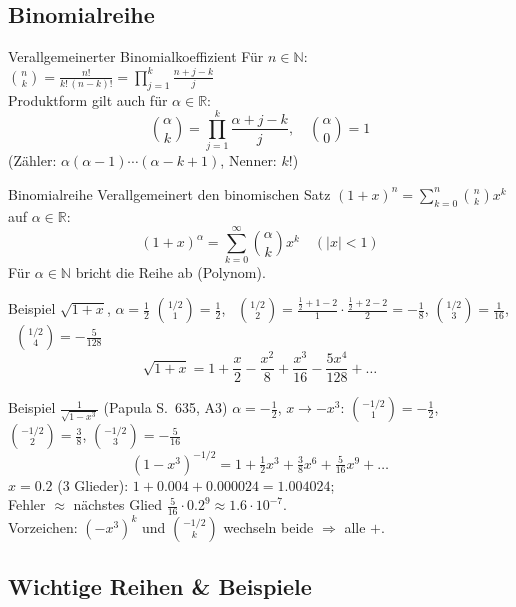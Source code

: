 \documentclass[a4paper, fontsize=7pt]{scrartcl}
\def\N{\mathbb{N}}  %
\def\R{\mathbb{R}}  %
\begin{document}
\subsection{Binomialreihe}

\begin{mainbox}{Verallgemeinerter Binomialkoeffizient}
Für $n \in \N$: $\binom{n}{k} = \frac{n!}{k!\,(n-k)!} =
\prod_{j=1}^{k} \frac{n + j - k}{j}$\\
Produktform gilt auch für $\alpha \in \R$:
$$\boxed{\binom{\alpha}{k} = \prod_{j=1}^{k} \frac{\alpha + j - k}{j}},
\quad \binom{\alpha}{0} = 1$$
(Zähler: $\alpha(\alpha-1)\cdots(\alpha-k+1)$, Nenner: $k!$)
\end{mainbox}

\begin{mainbox}{Binomialreihe}
Verallgemeinert den binomischen Satz
$(1+x)^n = \sum_{k=0}^{n} \binom{n}{k} x^k$ auf $\alpha \in \R$:
$$\boxed{(1 + x)^\alpha = \sum_{k=0}^{\infty} \binom{\alpha}{k} x^k}
\quad (|x| < 1)$$
Für $\alpha \in \N$ bricht die Reihe ab (Polynom).
\end{mainbox}

\begin{subbox}{Beispiel $\sqrt{1+x}$, $\alpha = \frac12$}
$\binom{1/2}{1} = \frac12$, \
$\binom{1/2}{2} = \frac{\frac12 + 1 - 2}{1}\cdot\frac{\frac12 + 2 - 2}{2} = -\frac18$,
$\binom{1/2}{3} = \frac{1}{16}$, \ $\binom{1/2}{4} = -\frac{5}{128}$
$$\sqrt{1+x} = 1 + \frac{x}{2} - \frac{x^2}{8} + \frac{x^3}{16}
- \frac{5x^4}{128} + \ldots$$
\end{subbox}

\begin{subbox}{Beispiel $\frac{1}{\sqrt{1 - x^3}}$ (Papula S.\ 635, A3)}
$\alpha = -\frac12$, $x \to -x^3$:
$\binom{-1/2}{1} = -\frac12$, $\binom{-1/2}{2} = \frac38$,
$\binom{-1/2}{3} = -\frac{5}{16}$
$$(1 - x^3)^{-1/2} = 1 + \tfrac12 x^3 + \tfrac38 x^6 + \tfrac{5}{16} x^9
+ \ldots$$
$x = 0.2$ (3 Glieder): $1 + 0.004 + 0.000024 = 1.004024$;\\
Fehler $\approx$ nächstes Glied $\frac{5}{16}\cdot 0.2^9 \approx 1.6
\cdot 10^{-7}$.\\
Vorzeichen: $(-x^3)^k$ und $\binom{-1/2}{k}$ wechseln beide $\Rightarrow$
alle $+$.
\end{subbox}

\subsection{Wichtige Reihen \& Beispiele}
\end{document}
